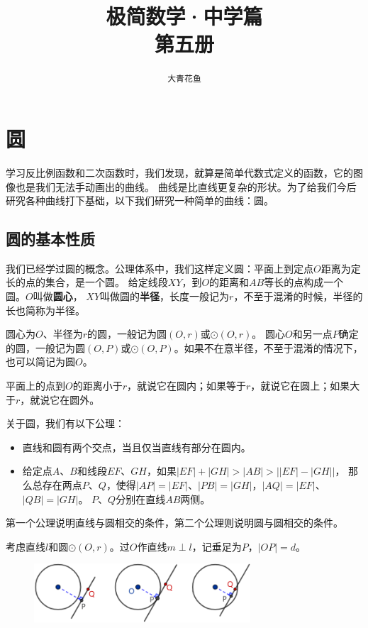 \documentclass[12pt,UTF8]{ctexbook}
\title{\zihao{0} \bfseries 极简数学·中学篇 \\ 第五册}
\author{\zihao{2} \texttt{大青花鱼}}
\date{}
\begin{document}
\maketitle
\tableofcontents
\newpage

\chapter{圆}

学习反比例函数和二次函数时，我们发现，就算是简单代数式定义的函数，它的图像也是我们无法手动画出的曲线。
曲线是比直线更复杂的形状。为了给我们今后研究各种曲线打下基础，以下我们研究一种简单的曲线：圆。

\section{圆的基本性质}
我们已经学过圆的概念。公理体系中，我们这样定义圆：平面上到定点$O$距离为定长的点的集合，是一个圆。
给定线段$XY$，到$O$的距离和$AB$等长的点构成一个圆。$O$叫做\textbf{圆心}，
$XY$叫做圆的\textbf{半径}，长度一般记为$r$，不至于混淆的时候，半径的长也简称为半径。

圆心为$O$、半径为$r$的圆，一般记为圆$(O, r)$或$\odot(O, r)$。
圆心$O$和另一点$P$确定的圆，一般记为圆$(O, P)$或$\odot(O, P)$。如果不在意半径，不至于混淆的情况下，
也可以简记为圆$O$。

平面上的点到$O$的距离小于$r$，就说它在圆内；如果等于$r$，就说它在圆上；如果大于$r$，就说它在圆外。

关于圆，我们有以下公理：
\begin{itemize}
    \item 直线和圆有两个交点，当且仅当直线有部分在圆内。
    \item 给定点$A$、$B$和线段$EF$、$GH$，如果$|EF| + |GH| > |AB| > \left||EF| - |GH|\right|$，
    那么总存在两点$P$、$Q$，使得$|AP| = |EF|$、$|PB| = |GH|$，$|AQ| = |EF|$、$|QB| = |GH|$。
    $P$、$Q$分别在直线$AB$两侧。
\end{itemize}
第一个公理说明直线与圆相交的条件，第二个公理则说明圆与圆相交的条件。

考虑直线$l$和圆$\odot(O, r)$。过$O$作直线$m\perp l$，记垂足为$P$，$|OP| = d$。

\begin{figure}[h] %
    \vspace{8pt}
    \centering
    \includegraphics[width=0.72\textwidth]{圆与直线1.png}
\end{figure}
\end{document}
